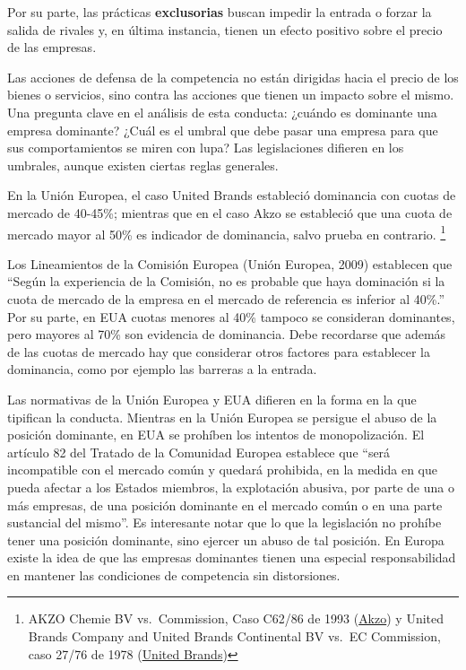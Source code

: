 \documentclass[
  12pt,
  spanish,
]{book}
\begin{document}
Por su parte, las prácticas \textbf{exclusorias} buscan impedir la entrada o forzar la salida de rivales y, en última instancia, tienen un efecto positivo sobre el precio de las empresas.

Las acciones de defensa de la competencia no están dirigidas hacia el precio de los bienes o servicios, sino contra las acciones que tienen un impacto sobre el mismo. Una pregunta clave en el análisis de esta conducta: ¿cuándo es dominante una empresa dominante? ¿Cuál es el umbral que debe pasar una empresa para que sus comportamientos se miren con lupa? Las legislaciones difieren en los umbrales, aunque existen ciertas reglas generales.

En la Unión Europea, el caso United Brands estableció dominancia con cuotas de mercado de 40-45\%; mientras que en el caso Akzo se estableció que una cuota de mercado mayor al 50\% es indicador de dominancia, salvo prueba en contrario.
\footnote{AKZO Chemie BV vs.~Commission, Caso C62/86 de 1993 (\href{https://eur-lex.europa.eu/resource.html?uri=cellar:4905ac67-5a02-44a0-ae93-7724be6073b0.0008.02/DOC_1\&format=PDF}{Akzo}) y United Brands Company and United Brands Continental BV vs.~EC Commission, caso 27/76 de 1978 (\href{https://eur-lex.europa.eu/legal-content/ES/TXT/PDF/?uri=CELEX:61976CJ0027\&from=EN}{United Brands})}

Los Lineamientos de la Comisión Europea (Unión Europea, 2009) establecen que ``Según la experiencia de la Comisión, no es probable que haya dominación si la cuota de mercado de la empresa en el mercado de referencia es inferior al 40\%.'' Por su parte, en EUA cuotas menores al 40\% tampoco se consideran dominantes, pero mayores al 70\% son evidencia de dominancia. Debe recordarse que además de las cuotas de mercado hay que considerar otros factores para establecer la dominancia, como por ejemplo las barreras a la entrada.

Las normativas de la Unión Europea y EUA difieren en la forma en la que tipifican la conducta. Mientras en la Unión Europea se persigue el abuso de la posición dominante, en EUA se prohíben los intentos de monopolización. El artículo 82 del Tratado de la Comunidad Europea establece que ``será incompatible con el mercado común y quedará prohibida, en la medida en que pueda afectar a los Estados miembros, la explotación abusiva, por parte de una o más empresas, de una posición dominante en el mercado común o en una parte sustancial del mismo''. Es interesante notar que lo que la legislación no prohíbe tener una posición dominante, sino ejercer un abuso de tal posición. En Europa existe la idea de que las empresas dominantes tienen una especial responsabilidad en mantener las condiciones de competencia sin distorsiones.
\end{document}
